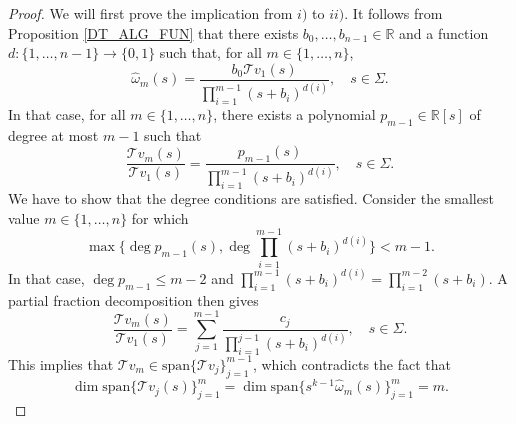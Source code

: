 \documentclass[a4paper,12pt,oneside]{article}
\theoremstyle{definition}
\newcommand{\R}{\mathbb{R}}
\newcommand{\om}{\omega}
\newcommand{\spn}[1]{\text{span}\{#1\}}
\newcommand{\T}[1]{\mathcal{T}#1}
\begin{document}
\begin{proof}
    We will first prove the implication from $i)$ to $ii)$. It follows from Proposition \ref{DT_ALG_FUN} that there exists $b_0,\dots,b_{n-1}\in\R$ and a function $d:\{1,\dots,n-1\}\to\{0,1\}$ such that, for all $m\in\{1,\dots,n\}$,
    $$ \hat{\om}_m(s) = \frac{b_0 \T{v_1}(s)}{\prod_{i=1}^{m-1} (s+b_i)^{d(i)}},\quad s\in\Sigma.$$
    In that case, for all $m\in\{1,\dots,n\}$, there exists a polynomial $p_{m-1}\in\R[s]$ of degree at most $m-1$ such that
        $$ \frac{\T{v_m}(s)}{\T{v_1}(s)} = \frac{p_{m-1}(s)}{\prod_{i=1}^{m-1}(s+b_i)^{d(i)}},\quad s\in\Sigma.$$
    We have to show that the degree conditions are satisfied. Consider the smallest value $m\in\{1,\dots,n\}$ for which 
    $$\max\{\deg p_{m-1}(s),\deg \prod_{i=1}^{m-1}(s+b_i)^{d(i)}\}<m-1.$$ 
    In that case, $\deg p_{m-1} \leq m-2$ and $\prod_{i=1}^{m-1}(s+b_i)^{d(i)} = \prod_{i=1}^{m-2}(s+b_i)$. A partial fraction decomposition then gives
    $$ \frac{\T{v_m}(s)}{\T{v_1}(s)} = \sum_{j=1}^{m-1} \frac{c_j}{\prod_{i=1}^{j-1}(s+b_i)^{d(i)}},\quad s\in\Sigma. $$
    This implies that $\T{v_m} \in \spn{\T{v_j}}_{j=1}^{m-1}$, which contradicts the fact that 
    $$\dim\spn{\T{v_j}(s)}_{j=1}^{m}=\dim\spn{s^{k-1}\hat{\om}_m(s)}_{j=1}^{m}=m.$$
    

\end{proof}
\end{document}
